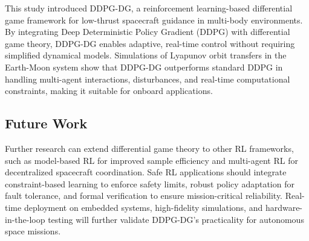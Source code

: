 \documentclass[conference]{IEEEtran}
\begin{document}
This study introduced DDPG-DG, a reinforcement learning-based differential game framework for low-thrust spacecraft guidance in multi-body environments. By integrating Deep Deterministic Policy Gradient (DDPG) with differential game theory, DDPG-DG enables adaptive, real-time control without requiring simplified dynamical models. Simulations of Lyapunov orbit transfers in the Earth-Moon system show that DDPG-DG outperforms standard DDPG in handling multi-agent interactions, disturbances, and real-time computational constraints, making it suitable for onboard applications.

\subsection{Future Work}

Further research can extend differential game theory to other RL frameworks, such as model-based RL for improved sample efficiency and multi-agent RL for decentralized spacecraft coordination. Safe RL applications should integrate constraint-based learning to enforce safety limits, robust policy adaptation for fault tolerance, and formal verification to ensure mission-critical reliability. Real-time deployment on embedded systems, high-fidelity simulations, and hardware-in-the-loop testing will further validate DDPG-DG’s practicality for autonomous space missions.






\end{document}
